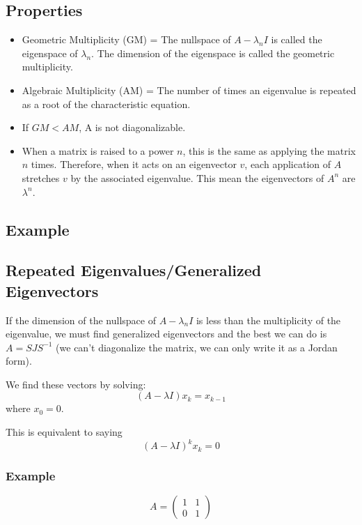 \documentclass[12pt]{article}
\begin{document}
\begin{itemize}
\subsection{Properties}
\begin{itemize}
\item Geometric Multiplicity (GM) = The nullspace of $A - \lambda_n I$ is called the eigenspace of $\lambda_n$. The dimension of the eigenspace is called the geometric multiplicity.

\item Algebraic Multiplicity (AM) = The number of times an eigenvalue is repeated as a root of the characteristic equation.

\item If $GM < AM$, A is not diagonalizable.

\item When a matrix is raised to a power $n$, this is the same as applying the matrix $n$ times.  Therefore, when it acts on an eigenvector $v$, each application of $A$ stretches $v$ by the associated eigenvalue.  This mean the eigenvectors of $A^n$ are $\lambda^n$.
\end{itemize}

\subsection{Example}

\subsection{Repeated Eigenvalues/Generalized Eigenvectors}
If the dimension of the nullspace of $A-\lambda_n I$ is less than the multiplicity of the eigenvalue, we must find generalized eigenvectors and the best we can do is $A = SJS^{-1}$ (we can't diagonalize the matrix, we can only write it as a Jordan form).

We find these vectors by solving:
\begin{equation*}
(A-\lambda I)x_k = x_{k-1}
\end{equation*}
where $x_0 = 0$.

This is equivalent to saying
\begin{equation*}
(A-\lambda I)^k x_k = 0
\end{equation*}

\subsubsection{Example}
\begin{equation*}
A = \begin{pmatrix}
1&1\\
0&1 \end{pmatrix}
\end{equation*}


\end{itemize}
\end{document}
